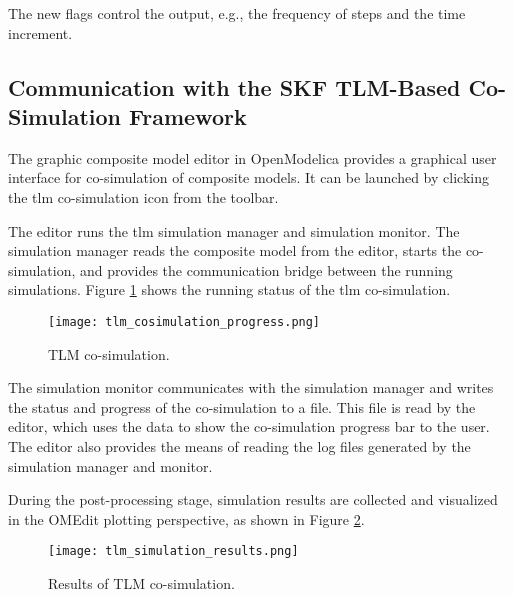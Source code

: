 The new flags control the output, e.g., the frequency of
steps and the time increment. 

\clearpage
\subsection{Communication with the SKF TLM-Based Co-Simulation Framework}
\label{sec:tlmskf}

The graphic composite model editor in OpenModelica
provides a graphical user interface for co-simulation of
composite models. It can be launched by clicking the
\acrshort{tlm} co-simulation icon from the toolbar.



The editor runs the \acrshort{tlm} simulation manager and simulation monitor. The simulation manager reads the
composite model from the editor, starts the co-simulation, and provides the communication bridge
between the running simulations. Figure \ref{fig:tlmcosimulationprogress} shows the running status of the \acrshort{tlm} co-simulation.


\begin{figure} [!h]
	\texttt{[image: tlm\_cosimulation\_progress.png]}
	\caption{TLM co-simulation.}
	\label{fig:tlmcosimulationprogress}
\end{figure}

The simulation monitor communicates with the simulation manager and writes the status and progress of the co-simulation to a file. 
This file is read by the editor, which uses the data to show the co-simulation progress bar to the user. 
The editor also provides the means of reading the log files generated by the simulation manager and monitor.

\clearpage
During the post-processing stage, simulation results are collected and visualized in the OMEdit 
plotting perspective, as shown in Figure \ref{fig:tlmsimulationresults}.
 

\begin{figure} [!h] 
	\texttt{[image: tlm\_simulation\_results.png]}
	\caption{Results of TLM co-simulation.}
	\label{fig:tlmsimulationresults}
\end{figure}


